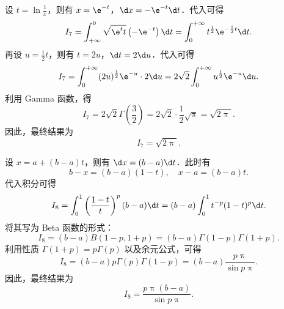 \begin{solution}
    设 $t = \ln \frac{1}{x}$，则有 $x = \e^{-t}$，$\d x = -\e^{-t} \d t$．代入可得
    \begin{equation}\label{eq:sol7-1}
        I_7 = \int_{+\infty}^{0} \sqrt{\e^t t} \left(-\e^{-t}\right) \d t = \int_{0}^{+\infty} t^{\frac{1}{2}} \e^{-\frac{1}{2}t} \d t.
    \end{equation}
    再设 $u = \frac{1}{2}t$，则有 $t = 2u$，$\d t = 2 \d u$．代入可得
    \begin{equation}\label{eq:sol7-2}
        I_7 = \int_{0}^{+\infty} (2u)^{\frac{1}{2}} \e^{-u} \cdot 2 \d u = 2\sqrt{2} \int_{0}^{+\infty} u^{\frac{1}{2}} \e^{-u} \d u.
    \end{equation}
    利用 Gamma 函数，得
    \begin{equation}\label{eq:sol7-3}
        I_7 = 2\sqrt{2} \Gamma\left(\frac{3}{2}\right) = 2\sqrt{2} \cdot \frac{1}{2}\sqrt{\uppi} = \sqrt{2\uppi}.
    \end{equation}
    因此，最终结果为
    \begin{equation}
        I_7 = \boxed{\sqrt{2\uppi}}.
    \end{equation}


    设 $x = a + (b-a)t$，则有 $\d x = (b-a)\d t$．此时有
    \begin{equation}\label{eq:sol8-1}
        b-x = (b-a)(1-t), \quad x-a = (b-a)t.
    \end{equation}
    代入积分可得
    \begin{equation}\label{eq:sol8-2}
        I_8 = \int_{0}^{1} \left(\frac{1-t}{t}\right)^p (b-a) \d t = (b-a) \int_{0}^{1} t^{-p} (1-t)^p \d t.
    \end{equation}
    将其写为 Beta 函数的形式：
    \begin{equation}\label{eq:sol8-3}
        I_8 = (b-a) B(1-p, 1+p) = (b-a) \Gamma(1-p) \Gamma(1+p).
    \end{equation}
    利用性质 $\Gamma(1+p) = p \Gamma(p)$ 以及余元公式，可得
    \begin{equation}\label{eq:sol8-4}
        I_8 = (b-a) p \Gamma(p) \Gamma(1-p) = (b-a) \frac{p\uppi}{\sin p\uppi}.
    \end{equation}
    因此，最终结果为
    \begin{equation}
        I_8 = \boxed{\frac{p\uppi(b-a)}{\sin p\uppi}}.
    \end{equation}



\end{solution}
